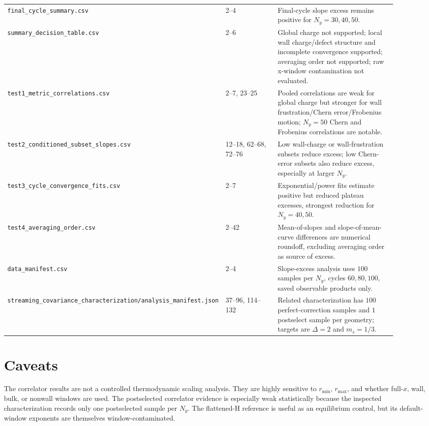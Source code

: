 \documentclass[aps,prb,onecolumn,nofootinbib,superscriptaddress]{revtex4-2}
\begin{document}
\begin{center}
\begin{tabular}{p{0.30\linewidth}p{0.20\linewidth}p{0.42\linewidth}}
\texttt{final\_cycle\_summary.csv} & 2--4 & Final-cycle slope excess remains positive for \(N_y=30,40,50\). \\
\texttt{summary\_decision\_table.csv} & 2--6 & Global charge not supported; local wall charge/defect structure and incomplete convergence supported; averaging order not supported; raw x-window contamination not evaluated. \\
\texttt{test1\_metric\_correlations.csv} & 2--7, 23--25 & Pooled correlations are weak for global charge but stronger for wall frustration/Chern error/Frobenius motion; \(N_y=50\) Chern and Frobenius correlations are notable. \\
\texttt{test2\_conditioned\_subset\_slopes.csv} & 12--18, 62--68, 72--76 & Low wall-charge or wall-frustration subsets reduce excess; low Chern-error subsets also reduce excess, especially at larger \(N_y\). \\
\texttt{test3\_cycle\_convergence\_fits.csv} & 2--7 & Exponential/power fits estimate positive but reduced plateau excesses, strongest reduction for \(N_y=40,50\). \\
\texttt{test4\_averaging\_order.csv} & 2--42 & Mean-of-slopes and slope-of-mean-curve differences are numerical roundoff, excluding averaging order as source of excess. \\
\texttt{data\_manifest.csv} & 2--4 & Slope-excess analysis uses \(100\) samples per \(N_y\), cycles \(60,80,100\), saved observable products only. \\
\texttt{streaming\_covariance\_characterization/analysis\_manifest.json} & 37--96, 114--132 & Related characterization has \(100\) perfect-correction samples and \(1\) postselect sample per geometry; targets are \(\Delta=2\) and \(m_s=1/3\). \\
\bottomrule
\end{tabular}
\end{center}

\section{Caveats}

The correlator results are not a controlled thermodynamic scaling analysis. They are highly sensitive to \(r_{\min}\), \(r_{\max}\), and whether full-\(x\), wall, bulk, or nonwall windows are used. The postselected correlator evidence is especially weak statistically because the inspected characterization records only one postselected sample per \(N_y\). The flattened-H reference is useful as an equilibrium control, but its default-window exponents are themselves window-contaminated.
\end{document}
